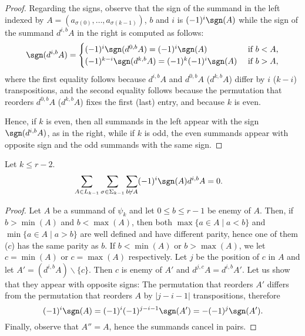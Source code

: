 \begin{proof}

	Regarding the signs, observe that the sign of the summand in the left indexed by $A = (a_{\sigma(0)},\ldots,a_{\sigma(k-1)})$, $b$ and $i$ is $(-1)^i\sgn(A)$ while the sign of the summand $d^{i,b}A$ in the right is computed as follows:
	\[
		\sgn(d^{i,b}A) =
		\begin{cases}
			(-1)^i\sgn(d^{0,b}A) = (-1)^i\sgn(A) &\text{ if $b<A$,}\\
			(-1)^{k-i}\sgn(d^{k,b}A) = (-1)^k(-1)^i\sgn(A) &\text{ if $b>A$,}
		\end{cases}
	\]
	where the first equality follows because $d^{i,b}A$ and $d^{0,b}A$ (\resp $d^{k,b}A$) differ by $i$ (\resp $k-i$) transpositions, and the second equality follows because the permutation that reorders $d^{0,b}A$ (\resp $d^{k,b}A$) fixes the first (last) entry, and because $k$ is even.

	Hence, if $k$ is even, then all summands in the left appear with the sign $\sgn(d^{i,b}A)$, as in the right, while if $k$ is odd, the even summands appear with opposite sign and the odd summands with the same sign.
\end{proof}

\begin{lemma}\label{lemma:cancel}
	Let $k\leq r-2$.
	\begin{align*}
		\sum_{A\in L_{k-1}}\sum_{\sigma\in \Sigma_{k-1}}\sum_{b\not{\vdash} A}(-1)^i\sgn(A)d^{i,b}A &= 0.
	\end{align*}
\end{lemma}

\begin{proof}
	Let $A$ be a summand of $\psi_k$ and let $0\leq b\leq r-1$ be enemy of $A$. Then, if $b >\min(A)$ and $b<\max(A)$, then both $\max\{a\in A\mid a<b\}$ and $\min\{a\in A\mid a>b\}$ are well defined and have different parity, hence one of them ($c$) has the same parity as $b$. If $b<\min(A)$ or $b>\max(A)$, we let $c = \min(A)$ or $c = \max(A)$ respectively. Let $j$ be the position of $c$ in $A$ and let $A' = (d^{i,b} A)\smallsetminus \{c\}$. Then $c$ is enemy of $A'$ and $d^{j,c}A = d^{i,b}A'$. Let us show that they appear with opposite signs: The permutation that reorders $A'$ differs from the permutation that reorders $A$ by $|j-i-1|$ transpositions, therefore
	\[(-1)^{i}\sgn(A) = (-1)^{i}(-1)^{j-i-1}\sgn(A') = -(-1)^j\sgn(A').\]
	Finally, observe that $A'' = A$, hence the summands cancel in pairs.
\end{proof}